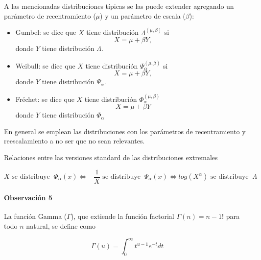 \documentclass[
  12pt]{article}
\begin{document}
A las mencionadas distribuciones típicas se las puede extender agregando
un parámetro de recentramiento (\(\mu\)) y un parámetro de escala
(\(\beta\)):

\begin{itemize}
\item Gumbel: se dice que $X$ tiene distribución $\Lambda^{(\mu,\beta)}$ si
\begin{equation}
X=\mu+\beta Y,
\end{equation}
donde $Y$ tiene distribución $\Lambda$.

\item Weibull: se dice que $X$ tiene distribución $\Psi_{\alpha}^{(\mu,\beta)}$ si 
\begin{equation}
X=\mu+\beta Y,
\end{equation}
donde $Y$ tiene distribución $\Psi_{\alpha}$.

\item  Fréchet: se dice que $X$ tiene distribución $\Phi_{\alpha}^{(\mu,\beta)}$ 
\begin{equation}
X=\mu+\beta Y
\end{equation}
donde $Y$ tiene distribución $\Phi_{\alpha}$
\end{itemize}

En general se emplean las distribuciones con los parámetros de
recentramiento y reescalamiento a no ser que no sean relevantes.

\begin{theorem} Relaciones entre las versiones standard de las distribuciones extremales

$$
X\text{ se distribuye }\:\Phi_{\alpha}(x) \iff -\frac{1}{X}\text{ se distribuye }\:\Psi_{\alpha}(x) \iff log(X^{\alpha})\text{ se distribuye }\:\Lambda
$$
\end{theorem}

\paragraph*{Observación 5}

La función Gamma (\(\Gamma\)), que extiende la función factorial
\(\Gamma(n)=n-1!\) para todo \(n\) natural, se define como

\begin{equation}
\Gamma(u)=\int_0^{\infty}t^{u-1}e^{-t}dt
\end{equation}
\end{document}
